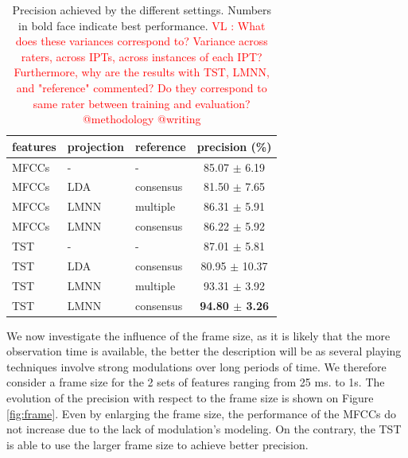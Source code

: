 \documentclass{article}
\newcommand{\vl}[1]{\textcolor{red}{VL : #1}}
\begin{document}
\begin{table}
  \caption{Precision achieved by the different settings. Numbers in bold face indicate best performance. \vl{What does these variances correspond to? Variance across raters, across IPTs, across instances of each IPT? Furthermore, why are the results with TST, LMNN, and "reference" commented? Do they correspond to same rater between training and evaluation? @methodology @writing}}
  \label{tab:res1}
  \begin{center}
\begin{tabular}{lllc}
features & projection & reference & precision (\%) \\
  \hline
  MFCCs & - & - &   85.07 $\pm$ 6.19 \\
  MFCCs & LDA &  consensus  &   81.50 $\pm$ 7.65 \\
MFCCs & LMNN & multiple & 86.31 $\pm$ 5.91 \\
MFCCs & LMNN & consensus &   86.22 $\pm$ 5.92 \\
TST & - & - &   87.01 $\pm$ 5.81 \\
TST & LDA & consensus &   80.95 $\pm$ 10.37 \\
TST & LMNN  & multiple  &   93.31 $\pm$ 3.92 \\
TST & LMNN & consensus &   \textbf{94.80 $\pm$ 3.26} \\
\end{tabular}
\end{center}
\end{table}

We now investigate the influence of the frame size, as it is likely that the more observation time is available, the better the description will be as several playing techniques involve strong modulations over long periods of time. We therefore consider a frame size for the 2 sets of features ranging from 25 ms. to 1s. The evolution of the precision with respect to the frame size is shown on Figure \ref{fig:frame}. Even by enlarging the frame size, the performance of the MFCCs do not increase due to the lack of modulation's modeling. On the contrary, the TST is able to use the larger frame size to achieve better precision.
\end{document}
